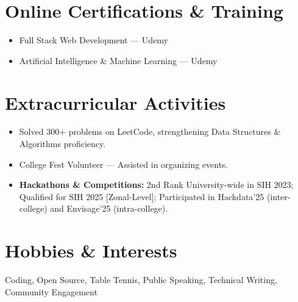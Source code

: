 \documentclass[10pt]{article}
\newcommand{\resumeItem}[1]{\item{\small #1}}
\begin{document}
\section*{Online Certifications \& Training}
\begin{itemize}
  \resumeItem{Full Stack Web Development --- Udemy}
  \resumeItem{Artificial Intelligence \& Machine Learning --- Udemy}
\end{itemize}

\section*{Extracurricular Activities}
\begin{itemize}
  \resumeItem{Solved 300+ problems on LeetCode, strengthening Data Structures \& Algorithms proficiency.}
  \resumeItem{College Fest Volunteer --- Assisted in organizing events.}
  \resumeItem{\textbf{Hackathons \& Competitions:} 2nd Rank University-wide in SIH 2023; Qualified for SIH 2025 [Zonal-Level]; Participated in Hackdata'25 (inter-college) and Envisage'25 (intra-college).}
\end{itemize}

\section*{Hobbies \& Interests}
\small Coding, Open Source, Table Tennis, Public Speaking, Technical Writing, Community Engagement
\end{document}
